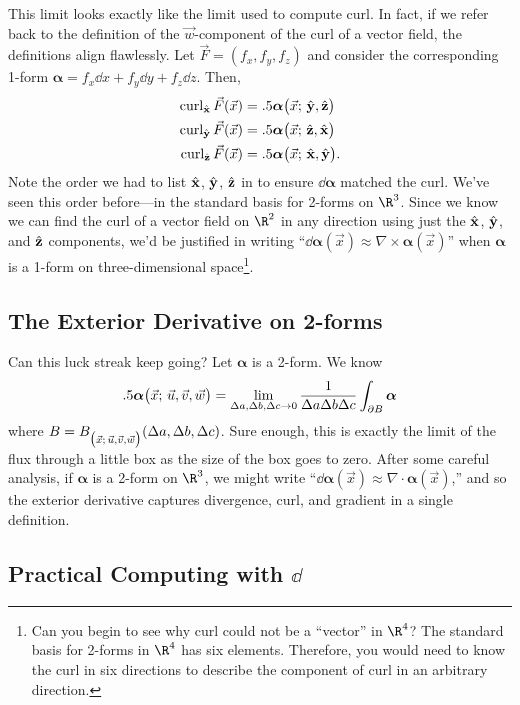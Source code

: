 This limit looks exactly like the limit used to compute curl.  In fact,
if we refer back to the definition of the $\vec w$-component of the curl
of a vector field, the definitions align flawlessly.  Let $\vec F=(f_x,f_y,f_z)$
and consider the corresponding 1-form $\bm\alpha = f_x\dd x+f_y\dd y+f_z\dd z$.
Then,
\begin{align*}
	\operatorname{curl}_{{\hat {\mathbf x}}} \vec F(\vec x) &= .5 \bm\alpha\big(\vec x;\, {\hat {\mathbf y}},{\hat {\mathbf z}}\big)\\
	\operatorname{curl}_{{\hat {\mathbf y}}} \vec F(\vec x) &= .5 \bm\alpha\big(\vec x;\, {\hat {\mathbf z}},{\hat {\mathbf x}}\big)\\
	\operatorname{curl}_{{\hat {\mathbf z}}} \vec F(\vec x) &= .5 \bm\alpha\big(\vec x;\, {\hat {\mathbf x}},{\hat {\mathbf y}}\big).
\end{align*}
Note the order we had to list ${\hat {\mathbf x}}$, ${\hat {\mathbf y}}$, ${\hat {\mathbf z}}$ in to ensure $\dd\bm\alpha$
matched the curl.  We've seen this order before---in the standard basis for 2-forms
on $\R^3$.  Since we know we can find the curl of a vector field on $\R^2$ in
any direction using just the ${\hat {\mathbf x}}$, ${\hat {\mathbf y}}$, and ${\hat {\mathbf z}}$ components, we'd be
justified in writing ``$\dd \bm\alpha(\vec x) \approx \nabla \times \bm\alpha(\vec x)$''
when $\bm\alpha$ is a 1-form on three-dimensional space\footnote{
Can you begin to see why curl could not be a ``vector'' in $\R^4$?  The standard basis
for 2-forms in $\R^4$ has six elements.  Therefore, you would need to know the
curl in six directions to describe the component of curl in an arbitrary direction.
}.

\subsection{The Exterior Derivative on 2-forms}
Can this luck streak keep going?  Let $\bm\alpha$ is a 2-form.  We know
\[
	.5 \bm\alpha\big(\vec x;\, \vec u,\vec v,\vec w\big)
	= \lim_{\Delta a,\Delta b,\Delta c\to 0} \frac{1}{\Delta a\Delta b\Delta c} \int_{\partial B} \bm\alpha
\]
where $B=B_{\big(\vec x;\, \vec u,\vec v,\vec w\big)}(\Delta a,\Delta b,\Delta c)$.
Sure enough, this is exactly the limit of the flux through a little box as the size of the
box goes to zero.  After some careful analysis, if $\bm\alpha$ is a 2-form on $\R^3$,
we might write ``$\dd \bm\alpha(\vec x) \approx \nabla \cdot \bm\alpha(\vec x)$,''
and so the exterior derivative captures divergence, curl, and gradient in a single
definition.

\subsection{Practical Computing with $\dd$}


